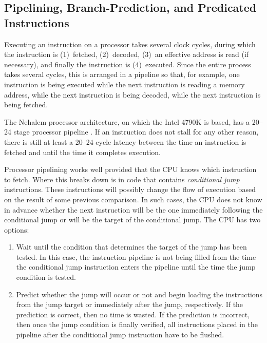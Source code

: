 \documentclass{patmorin}
\begin{document}
\subsection{Pipelining, Branch-Prediction, and Predicated Instructions}

Executing an instruction on a processor takes several clock cycles, during
which the instruction is (1)~fetched, (2)~decoded, (3)~an effective
address is read (if necessary), and finally the instruction is
(4)~executed.  Since the entire process takes several cycles, this
is arranged in a pipeline so that, for example, one instruction is being
executed while the next instruction is reading a memory address, while
the next instruction is being decoded, while the next instruction is
being fetched.

The Nehalem processor architecture, on which the Intel 4790K is based, has
a 20--24 stage processor pipeline \cite{bit-tech:intel}. If an instruction
does not stall for any other reason, there is still at least a 20--24
cycle latency between the time an instruction is fetched and until the
time it completes execution.

Processor pipelining works well provided that the CPU knows which
instruction to fetch.  Where this breaks down is in code that contains
\emph{conditional jump} instructions. These instructions will possibly
change the flow of execution based on the result of some previous
comparison.  In such cases, the CPU does not know in advance whether the
next instruction will be the one immediately following the conditional
jump or will be the target of the conditional jump. The CPU has two
options:
\begin{enumerate}
  \item Wait until the condition that determines the target
   of the jump has been tested. In this case, the instruction pipeline
   is not being filled from the time the conditional jump instruction
   enters the pipeline until the time the jump condition is tested.

  \item Predict whether the jump will occur or not and begin loading
  the instructions from the jump target or immediately after the jump,
  respectively.  If the prediction is correct, then no
  time is wasted. If the prediction is incorrect, then once the jump
  condition is finally verified, all instructions placed in the pipeline
  after the conditional jump instruction have to be flushed.
\end{enumerate}
\end{document}
